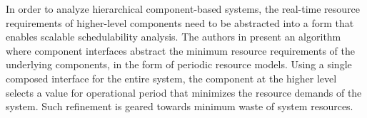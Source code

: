 In order to analyze hierarchical component-based systems, the real-time resource requirements of higher-level components need to be abstracted into a form that enables scalable schedulability analysis. The authors in \cite{easwaran2006} present an algorithm where component interfaces abstract the minimum resource requirements of the underlying components, in the form of periodic resource models. Using a single composed interface for the entire system, the component at the higher level selects a value for operational period that minimizes the resource demands of the system. Such refinement is geared towards minimum waste of system resources.
